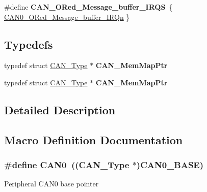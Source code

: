 \begin{DoxyCompactItemize}
\item 
\#define {\bfseries C\+A\+N\+\_\+\+O\+Red\+\_\+\+Message\+\_\+buffer\+\_\+\+I\+R\+QS}~\{ \hyperlink{group__Interrupt__vector__numbers_gga666eb0caeb12ec0e281415592ae89083a3723d82f494ab377fbaed01f8991824c}{C\+A\+N0\+\_\+\+O\+Red\+\_\+\+Message\+\_\+buffer\+\_\+\+I\+R\+Qn} \}\hypertarget{group__CAN__Peripheral__Access__Layer_gaecbe4b3a519aa77e5b8159da241c82ae}{}\label{group__CAN__Peripheral__Access__Layer_gaecbe4b3a519aa77e5b8159da241c82ae}

\end{DoxyCompactItemize}
\subsection*{Typedefs}
\begin{DoxyCompactItemize}
\item 
typedef struct \hyperlink{structCAN__Type}{C\+A\+N\+\_\+\+Type} $\ast$ {\bfseries C\+A\+N\+\_\+\+Mem\+Map\+Ptr}\hypertarget{group__CAN__Peripheral__Access__Layer_ga36550870fb66103634284e98ec2dbaed}{}\label{group__CAN__Peripheral__Access__Layer_ga36550870fb66103634284e98ec2dbaed}

\item 
typedef struct \hyperlink{structCAN__Type}{C\+A\+N\+\_\+\+Type} $\ast$ {\bfseries C\+A\+N\+\_\+\+Mem\+Map\+Ptr}\hypertarget{group__CAN__Peripheral__Access__Layer_ga36550870fb66103634284e98ec2dbaed}{}\label{group__CAN__Peripheral__Access__Layer_ga36550870fb66103634284e98ec2dbaed}

\end{DoxyCompactItemize}


\subsection{Detailed Description}


\subsection{Macro Definition Documentation}
\subsubsection[{\texorpdfstring{C\+A\+N0}{CAN0}}]{\setlength{\rightskip}{0pt plus 5cm}\#define C\+A\+N0~(({\bf C\+A\+N\+\_\+\+Type} $\ast$){\bf C\+A\+N0\+\_\+\+B\+A\+SE})}\hypertarget{group__CAN__Peripheral__Access__Layer_ga8882ee5d18ec64b8193396ec6bc66fe5}{}\label{group__CAN__Peripheral__Access__Layer_ga8882ee5d18ec64b8193396ec6bc66fe5}
Peripheral C\+A\+N0 base pointer 

